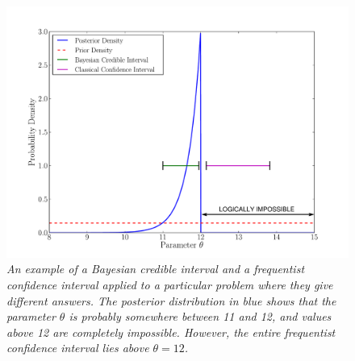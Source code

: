 \begin{figure}[!ht]
\begin{center}
\includegraphics[scale=0.5]{Figures/jaynes.pdf}
\caption{\it An example of a Bayesian credible interval and a frequentist confidence
interval applied to a particular problem where they give different answers.
The posterior distribution in blue shows that the parameter $\theta$ is probably
somewhere between 11 and 12, and values above 12 are completely impossible.
However, the entire frequentist confidence interval lies above $\theta=12$.
\label{fig:jaynes}}
\end{center}
\end{figure}


